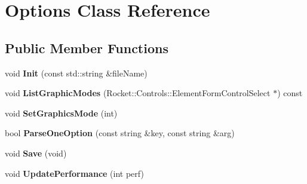 \hypertarget{classOptions}{\section{\-Options \-Class \-Reference}
\label{classOptions}
}
\subsection*{\-Public \-Member \-Functions}
\begin{DoxyCompactItemize}
\item 
\hypertarget{classOptions_ad3b1d757066830755ef9f6aa5e385fa7}{void {\bfseries \-Init} (const std\-::string \&file\-Name)}\label{classOptions_ad3b1d757066830755ef9f6aa5e385fa7}

\item 
\hypertarget{classOptions_aab1c845d114dec4f25c2c51b73d3da42}{void {\bfseries \-List\-Graphic\-Modes} (\-Rocket\-::\-Controls\-::\-Element\-Form\-Control\-Select $\ast$) const }\label{classOptions_aab1c845d114dec4f25c2c51b73d3da42}

\item 
\hypertarget{classOptions_a4f217bfbf7410778c79b19dedc9eb9ec}{void {\bfseries \-Set\-Graphics\-Mode} (int)}\label{classOptions_a4f217bfbf7410778c79b19dedc9eb9ec}

\item 
\hypertarget{classOptions_af3c3360d7cb6f9ce9949ce026ec59413}{bool {\bfseries \-Parse\-One\-Option} (const string \&key, const string \&arg)}\label{classOptions_af3c3360d7cb6f9ce9949ce026ec59413}

\item 
\hypertarget{classOptions_a804a3834fa4f3dcca0506b04a6797a52}{void {\bfseries \-Save} (void)}\label{classOptions_a804a3834fa4f3dcca0506b04a6797a52}

\item 
\hypertarget{classOptions_affdf37b165ac81501a63aee112946f1c}{void {\bfseries \-Update\-Performance} (int perf)}\label{classOptions_affdf37b165ac81501a63aee112946f1c}

\end{DoxyCompactItemize}
